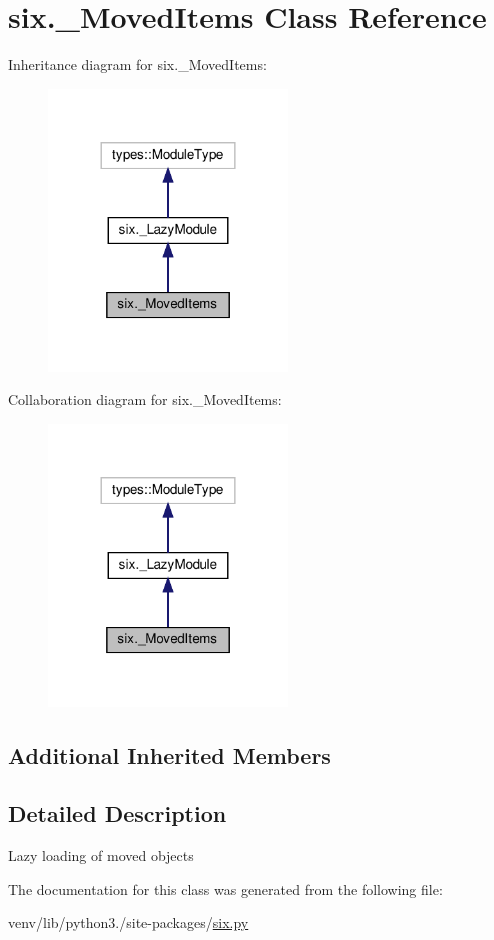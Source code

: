 \hypertarget{classsix_1_1__MovedItems}{}\section{six.\+\_\+\+Moved\+Items Class Reference}
\label{classsix_1_1__MovedItems}


Inheritance diagram for six.\+\_\+\+Moved\+Items\+:
\nopagebreak
\begin{figure}[H]
\begin{center}
\leavevmode
\includegraphics[width=180pt]{classsix_1_1__MovedItems__inherit__graph}
\end{center}
\end{figure}


Collaboration diagram for six.\+\_\+\+Moved\+Items\+:
\nopagebreak
\begin{figure}[H]
\begin{center}
\leavevmode
\includegraphics[width=180pt]{classsix_1_1__MovedItems__coll__graph}
\end{center}
\end{figure}
\subsection*{Additional Inherited Members}


\subsection{Detailed Description}
\begin{DoxyVerb}Lazy loading of moved objects\end{DoxyVerb}
 

The documentation for this class was generated from the following file\+:\begin{DoxyCompactItemize}
\item 
venv/lib/python3./site-\/packages/\hyperlink{six_8py}{six.\+py}\end{DoxyCompactItemize}
